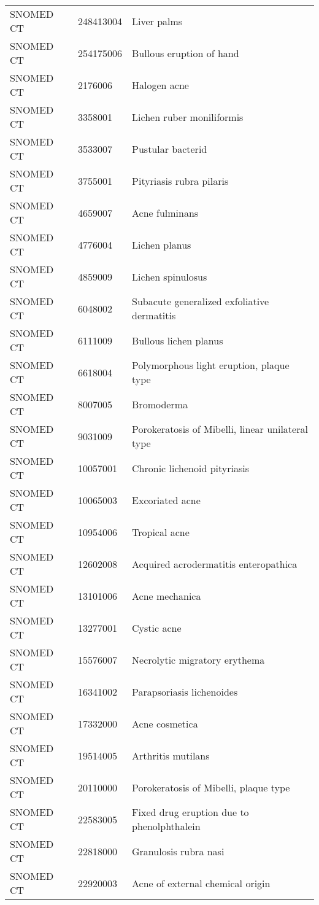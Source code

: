 \begin{longtable}{p{}p{}p{}}
  SNOMED CT & 248413004 & Liver palms \\ 
  SNOMED CT & 254175006 & Bullous eruption of hand \\ 
  SNOMED CT & 2176006 & Halogen acne \\ 
  SNOMED CT & 3358001 & Lichen ruber moniliformis \\ 
  SNOMED CT & 3533007 & Pustular bacterid \\ 
  SNOMED CT & 3755001 & Pityriasis rubra pilaris \\ 
  SNOMED CT & 4659007 & Acne fulminans \\ 
  SNOMED CT & 4776004 & Lichen planus \\ 
  SNOMED CT & 4859009 & Lichen spinulosus \\ 
  SNOMED CT & 6048002 & Subacute generalized exfoliative dermatitis \\ 
  SNOMED CT & 6111009 & Bullous lichen planus \\ 
  SNOMED CT & 6618004 & Polymorphous light eruption, plaque type \\ 
  SNOMED CT & 8007005 & Bromoderma \\ 
  SNOMED CT & 9031009 & Porokeratosis of Mibelli, linear unilateral type \\ 
  SNOMED CT & 10057001 & Chronic lichenoid pityriasis \\ 
  SNOMED CT & 10065003 & Excoriated acne \\ 
  SNOMED CT & 10954006 & Tropical acne \\ 
  SNOMED CT & 12602008 & Acquired acrodermatitis enteropathica \\ 
  SNOMED CT & 13101006 & Acne mechanica \\ 
  SNOMED CT & 13277001 & Cystic acne \\ 
  SNOMED CT & 15576007 & Necrolytic migratory erythema \\ 
  SNOMED CT & 16341002 & Parapsoriasis lichenoides \\ 
  SNOMED CT & 17332000 & Acne cosmetica \\ 
  SNOMED CT & 19514005 & Arthritis mutilans \\ 
  SNOMED CT & 20110000 & Porokeratosis of Mibelli, plaque type \\ 
  SNOMED CT & 22583005 & Fixed drug eruption due to phenolphthalein \\ 
  SNOMED CT & 22818000 & Granulosis rubra nasi \\ 
  SNOMED CT & 22920003 & Acne of external chemical origin \\ 

\end{longtable}
